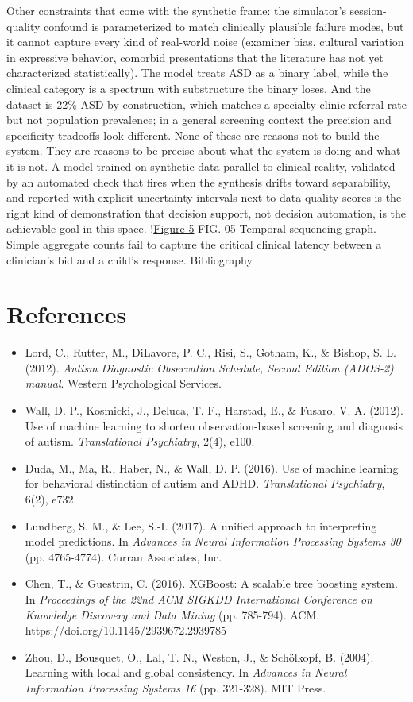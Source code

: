 \documentclass{obelus-preprint}
\begin{document}
Other constraints that come with the synthetic frame: the simulator's session-quality confound is parameterized to match clinically plausible failure modes, but it cannot capture every kind of real-world noise (examiner bias, cultural variation in expressive behavior, comorbid presentations that the literature has not yet characterized statistically). The model treats ASD as a binary label, while the clinical category is a spectrum with substructure the binary loses. And the dataset is 22\% ASD by construction, which matches a specialty clinic referral rate but not population prevalence; in a general screening context the precision and specificity tradeoffs look different.
None of these are reasons not to build the system. They are reasons to be precise about what the system is doing and what it is not. A model trained on synthetic data parallel to clinical reality, validated by an automated check that fires when the synthesis drifts toward separability, and reported with explicit uncertainty intervals next to data-quality scores is the right kind of demonstration that decision support, not decision automation, is the achievable goal in this space.
!\href{fig_5.svg}{Figure 5}
FIG. 05 Temporal sequencing graph. Simple aggregate counts fail to capture the critical clinical latency between a clinician's bid and a child's response.
Bibliography
\section{References}
\begin{itemize}[leftmargin=*]
  \item Lord, C., Rutter, M., DiLavore, P. C., Risi, S., Gotham, K., \& Bishop, S. L. (2012). \emph{Autism Diagnostic Observation Schedule, Second Edition (ADOS-2) manual}. Western Psychological Services.
  \item Wall, D. P., Kosmicki, J., Deluca, T. F., Harstad, E., \& Fusaro, V. A. (2012). Use of machine learning to shorten observation-based screening and diagnosis of autism. \emph{Translational Psychiatry}, 2(4), e100.
  \item Duda, M., Ma, R., Haber, N., \& Wall, D. P. (2016). Use of machine learning for behavioral distinction of autism and ADHD. \emph{Translational Psychiatry}, 6(2), e732.
  \item Lundberg, S. M., \& Lee, S.-I. (2017). A unified approach to interpreting model predictions. In \emph{Advances in Neural Information Processing Systems 30} (pp. 4765-4774). Curran Associates, Inc.
  \item Chen, T., \& Guestrin, C. (2016). XGBoost: A scalable tree boosting system. In \emph{Proceedings of the 22nd ACM SIGKDD International Conference on Knowledge Discovery and Data Mining} (pp. 785-794). ACM. https://doi.org/10.1145/2939672.2939785
  \item Zhou, D., Bousquet, O., Lal, T. N., Weston, J., \& Schölkopf, B. (2004). Learning with local and global consistency. In \emph{Advances in Neural Information Processing Systems 16} (pp. 321-328). MIT Press.
\end{itemize}
\end{document}
